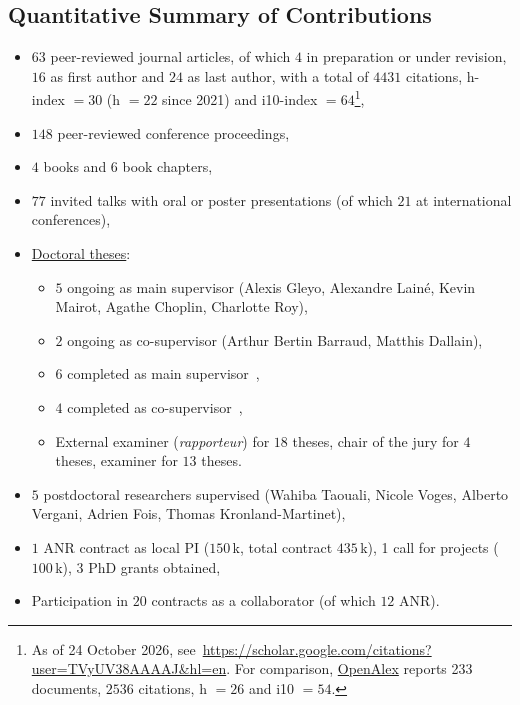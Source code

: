 \documentclass[10pt,english,a4paper,oneside]{article}%
\begin{document}
\subsection*{Quantitative Summary of Contributions}

\begin{itemize}

\item	$63$ peer-reviewed journal articles, of which $4$ in preparation or under revision, $16$ as first author and $24$ as last author, with a total of $4431$ citations, h-index $=30$ (h $=22$ since 2021) and i10-index $=64$\footnote{As of 24 October 2026, see~\url{https://scholar.google.com/citations?user=TVyUV38AAAAJ&hl=en}. For comparison, \href{https://openalex.org/authors/A5010769763}{OpenAlex} reports 233 documents, $2536$ citations, h $=26$ and i10 $=54$.},
\item	$148$ peer-reviewed conference proceedings,
\item	$4$ books and $6$ book chapters,
\item	$77$ invited talks with oral or poster presentations (of which $21$ at international conferences),
\item \href{https://www.theses.fr/074493701}{Doctoral theses}:
\begin{itemize}
	\item $5$ ongoing as main supervisor (Alexis Gleyo, Alexandre Lainé, Kevin Mairot, Agathe Choplin, Charlotte Roy),
	\item $2$ ongoing as co-supervisor (Arthur Bertin Barraud, Matthis Dallain),
	\item $6$ completed as main supervisor~\citep{Khoei14thesis,Boutin20thesis,Franciosini21thesis,Ladret24thesis,Grimaldi24thesis,Jeremie25thesis},
	\item $4$ completed as co-supervisor~\citep{Kremkow09thesis,Damasse18thesis,MansourPour19thesis,Gruel23thesis},
	\item External examiner (\emph{rapporteur}) for $18$ theses, chair of the jury for $4$ theses, examiner for $13$ theses.
\end{itemize} %
\item $5$ postdoctoral researchers supervised (Wahiba Taouali, Nicole Voges, Alberto Vergani, Adrien Fois, Thomas Kronland-Martinet),
\item $1$ ANR contract as local PI (\texteuro$150$\,k, total contract \texteuro$435$\,k), 1 call for projects (\texteuro$100$\,k), $3$ PhD grants obtained,
\item Participation in $20$ contracts as a collaborator (of which $12$ ANR).

\end{itemize} %
\end{document}
